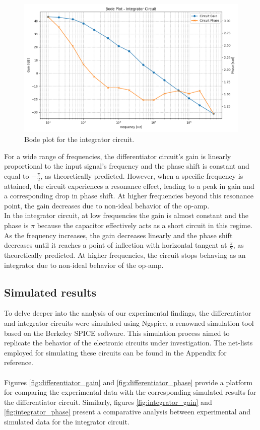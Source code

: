 		\begin{figure}[H]
			\centering
			\includegraphics[width=1\textwidth]{figures/integrator/bode_plot.png}
			\caption{Bode plot for the integrator circuit.}
			\label{fig:integrator_bode}
		\end{figure}
	
		\noindent
		For a wide range of frequencies, the differentiator circuit's gain is linearly proportional to the input signal's frequency and the phase shift is constant and equal to $-\frac{\pi}{2}$, as theoretically predicted.
		However, when a specific frequency is attained, the circuit experiences a resonance effect, leading to a peak in gain and a corresponding drop in phase shift. 
		At higher frequencies beyond this resonance point, the gain decreases due to non-ideal behavior of the op-amp. \\
		In the integrator circuit, at low frequencies the gain is almost constant and the phase is $\pi$ because the capacitor effectively acts as a short circuit in this regime.
		As the frequency increases, the gain decreases linearly and the phase shift decreases until it reaches a point of inflection with horizontal tangent at $\frac{\pi}{2}$, as theoretically predicted.
		At higher frequencies, the circuit stops behaving as an integrator due to non-ideal behavior of the op-amp. \\

	\subsection{Simulated results}
	   
		To delve deeper into the analysis of our experimental findings, the differentiator and integrator circuits were simulated using Ngspice, a renowned simulation tool based on the Berkeley SPICE software. 
		This simulation process aimed to replicate the behavior of the electronic circuits under investigation. 
		The net-lists employed for simulating these circuits can be found in the Appendix for reference. \\\\
		Figures \ref{fig:differentiator_gain} and \ref{fig:differentiator_phase} provide a platform for comparing the experimental data with the corresponding simulated results for the differentiator circuit.
		Similarly, figures \ref{fig:integrator_gain} and \ref{fig:integrator_phase} present a comparative analysis between experimental and simulated data for the integrator circuit. \\
		
